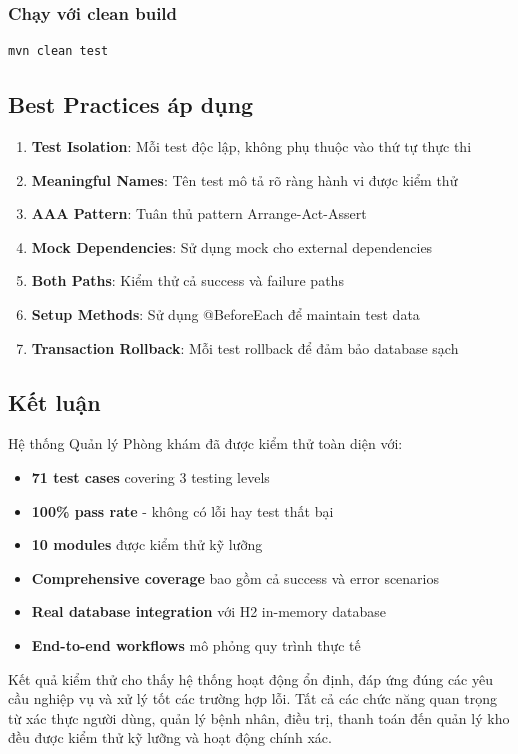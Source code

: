 \subsubsection{Chạy với clean build}

\begin{verbatim}
mvn clean test
\end{verbatim}

\subsection{Best Practices áp dụng}

\begin{enumerate}
    \item \textbf{Test Isolation}: Mỗi test độc lập, không phụ thuộc vào thứ tự thực thi
    \item \textbf{Meaningful Names}: Tên test mô tả rõ ràng hành vi được kiểm thử
    \item \textbf{AAA Pattern}: Tuân thủ pattern Arrange-Act-Assert
    \item \textbf{Mock Dependencies}: Sử dụng mock cho external dependencies
    \item \textbf{Both Paths}: Kiểm thử cả success và failure paths
    \item \textbf{Setup Methods}: Sử dụng @BeforeEach để maintain test data
    \item \textbf{Transaction Rollback}: Mỗi test rollback để đảm bảo database sạch
\end{enumerate}

\subsection{Kết luận}

Hệ thống Quản lý Phòng khám đã được kiểm thử toàn diện với:

\begin{itemize}
    \item \textbf{71 test cases} covering 3 testing levels
    \item \textbf{100\% pass rate} - không có lỗi hay test thất bại
    \item \textbf{10 modules} được kiểm thử kỹ lưỡng
    \item \textbf{Comprehensive coverage} bao gồm cả success và error scenarios
    \item \textbf{Real database integration} với H2 in-memory database
    \item \textbf{End-to-end workflows} mô phỏng quy trình thực tế
\end{itemize}

Kết quả kiểm thử cho thấy hệ thống hoạt động ổn định, đáp ứng đúng các yêu cầu nghiệp vụ và xử lý tốt các trường hợp lỗi. Tất cả các chức năng quan trọng từ xác thực người dùng, quản lý bệnh nhân, điều trị, thanh toán đến quản lý kho đều được kiểm thử kỹ lưỡng và hoạt động chính xác.
